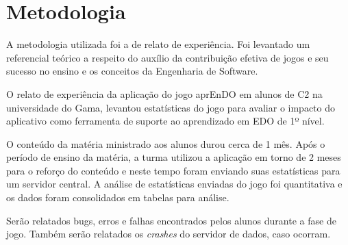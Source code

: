 \chapter[Metodologia]{Metodologia}
A metodologia utilizada foi a de relato de experiência. Foi levantado um referencial teórico a respeito do auxílio da contribuição efetiva de jogos e seu sucesso no ensino e os conceitos da Engenharia de Software.

O relato de experiência da aplicação do jogo aprEnDO em alunos de C2 na universidade do Gama, levantou estatísticas do jogo para avaliar o impacto do aplicativo como ferramenta de suporte ao aprendizado em EDO de 1º nível.

O conteúdo da matéria ministrado aos alunos durou cerca de 1 mês. Após o período de ensino da matéria, a turma utilizou a aplicação em torno de 2 meses para o reforço do conteúdo e neste tempo foram enviando suas estatísticas para um servidor central. A análise de estatísticas enviadas do jogo foi quantitativa e os dados foram consolidados em tabelas para análise. 

Serão relatados bugs, erros e falhas encontrados pelos alunos durante a fase de jogo. Também serão relatados os \textit{crashes} do servidor de dados, caso ocorram. 